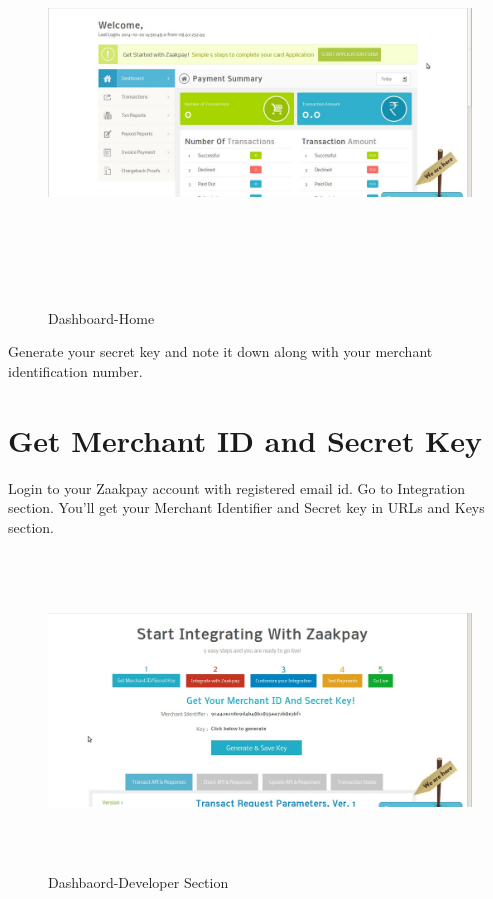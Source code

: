 \documentclass{article}
\begin{document}
 \begin{figure}[H]
\centering
\caption{Dashboard-Home}
\includegraphics[width=1.1\textwidth,height=4.2in]{Zaakpay_panel.png}
\end{figure}
Generate your secret key and note it down along with your merchant identification
number.

\newpage
\section{Get Merchant ID and Secret Key}
Login to your Zaakpay account with registered email id. Go to Integration section. You’ll get your Merchant Identifier and Secret key in URLs and Keys section. \\
\begin{figure}[H]
\centering
\caption{Dashbaord-Developer Section}
\includegraphics[width=1\textwidth,height=3.3in]{Zaakpay_panel1.png}
\end{figure}
\end{document}
